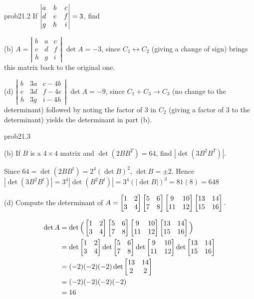 \begin{sol}{prob21.2} If $\left|\begin{matrix} a&b&c\cr d&e&f\cr g&h&i\end{matrix} \right|=3$,
find 
\medskip

(b) $A=\left|\begin{matrix}  b&a&c\\ e&d&f\\ h&g&i\end{matrix}\right|$
\soln $\det A= -3$, since $C_1 \leftrightarrow C_2$ (giving a change of sign) brings this matrix back to the original one.
\medskip

(d) $\left|\begin{matrix}  b&3a&c-4b\\ e&3d&f-4e\\ h&3g&i-4h\end{matrix}\right|$
\soln $\det A= -9$, since $C_1+C_3\to C_3$ (no change to the determinant) followed by noting the factor of 3 in $C_2$ (giving a factor of 3 to the determinant) yields the determinant in part (b).
\medskip

\end{sol}
\begin{sol}{prob21.3} 

 

(b) If $B$ is a $4\times 4$ matrix and $\det (2BB^T)=64$, find $|\det(3B^2B^T)|$.

\soln Since $64=\det (2BB^t)=2^4 (\det B)^2$, $\det B=\pm 2$. Hence $|\det(3B^2B^t)|=3^4|\det(B^2B^t)|=3^4(|\det B|)^3=81( 8)=648$
\medskip
%

(d) Compute the determinant of
$A=\bmatrix 1&2\cr3&4 \endbmatrix\bmatrix 5&6\cr7&8\endbmatrix 
\bmatrix9&10\cr11&12\endbmatrix\bmatrix 13&14\cr15&16\endbmatrix.$

\soln 
\begin{equation*}
\begin{split}
\det A &=\det\Big(\bmatrix 1&2\cr3&4 \endbmatrix\bmatrix 5&6\cr7&8\endbmatrix 
\bmatrix9&10\cr11&12\endbmatrix\bmatrix 13&14\cr15&16\endbmatrix\Big)\\&= \det \bmatrix 1&2\cr3&4 \endbmatrix \det \bmatrix 5&6\cr7&8\endbmatrix  \det \bmatrix9&10\cr11&12\endbmatrix \det \bmatrix 13&14\cr15&16\endbmatrix\\
&= (-2) (-2) (-2) \det \bmatrix 13&14\cr2&2\endbmatrix\\
&=(-2) (-2) (-2) (-2)\\
&=16
\end{split}\end{equation*}
\medskip


\end{sol}

